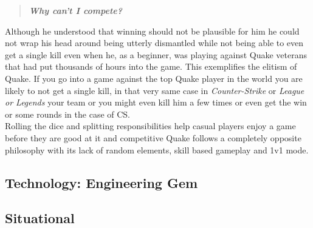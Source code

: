 \begin{quote}
\begin{center}
\textit{\textbf{Why can't I compete?}}
\end{center}
\end{quote}

Although he understood that winning should not be plausible for him he could not wrap his head around being utterly dismantled while not being able to even get a single kill even when he, as a beginner, was playing against Quake veterans that had put thousands of hours into the game. This exemplifies the elitism of Quake. If you go into a game against the top Quake player in the world you are likely to not get a single kill, in that very same case in \textit{Counter-Strike} or \textit{League or Legends} your team or you might even kill him a few times or even get the win or some rounds in the case of CS.\\

Rolling the dice and splitting responsibilities help casual players enjoy a game before they are good at it and competitive Quake follows a completely opposite philosophy with its lack of random elements, skill based gameplay and 1v1 mode.\\ 


\subsection{Technology: Engineering Gem }



\subsection{Situational}

































